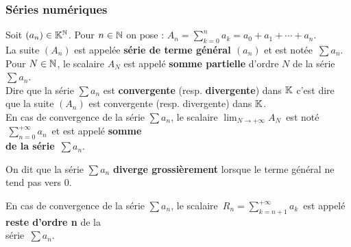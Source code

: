 \vspace*{1cm}

\subsubsection{Séries numériques}

\vspace{0.5cm}

Soit \((a_n)\in \mathbb{K}^{\mathbb{N}}\). Pour \(n\in \mathbb{N}\) on pose : \(\displaystyle A_n=\sum_{k=0}^{n} a_k = a_0+a_1+\cdots +a_n.  \)\vspace{0.1cm}\\
La suite \((A_n)\) est appelée \textbf{série de terme général $(a_n)$} et est notée \(\,\sum a_n\).\vspace{0.2cm}\\
Pour $N\in\mathbb{N}$, le scalaire \(A_N\) est appelé \textbf{somme partielle} d'ordre $N$ de la série \(\sum a_n\).\vspace{0.5cm}\\
Dire que la série \(\sum a_n\) est \textbf{convergente} (resp. \textbf{divergente}) dans \(\mathbb{K}\) c'est dire que la suite \((A_n)\) est convergente (resp. divergente) dans \(\mathbb{K}\).\vspace{-0.3cm}\\
En cas de convergence de la série \(\sum a_n\), le scalaire \(\displaystyle \lim_{N \to +\infty} A_N\,  \) est noté \(\,\displaystyle \sum_{n = 0}^{+\infty}a_n  \,\) et est appelé \textbf{somme}\vspace{-0.3cm} \\
\textbf{de la série} \(\,\sum a_n\).

\vspace{0.3cm}

\noindent On dit que la série \(\sum a_n\) \textbf{diverge grossièrement} lorsque le terme général ne tend pas vers $0$.

\vspace{0.3cm}

\noindent En cas de convergence de la série \(\sum a_n\), le scalaire \(\,\displaystyle R_n=\!\!\sum_{k=n+1}^{+\infty} a_k \, \) est appelé \textbf{reste d'ordre n} de la \vspace{-0.3cm} \\
série \(\,\sum a_n\).

